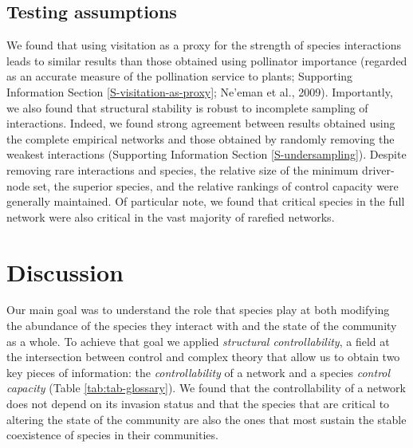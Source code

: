 \documentclass[a4paper]{artikel1}
\newcommand{\R}[1]{\label{#1}\linelabel{#1}}
\theoremstyle{definition}
\theoremstyle{definition}
\theoremstyle{definition}
\theoremstyle{remark}
\begin{document}
\subsection{Testing assumptions}\label{testing-assumptions-1}

\R{testing-assumptions-results-line} We found that using visitation as a
proxy for the strength of species interactions leads to similar results
than those obtained using pollinator importance (regarded as an accurate
measure of the pollination service to plants; Supporting Information
Section \ref{S-visitation-as-proxy}; Ne'eman et al., 2009). Importantly,
we also found that structural stability is robust to incomplete sampling
of interactions. Indeed, we found strong agreement between results
obtained using the complete empirical networks and those obtained by
randomly removing the weakest interactions (Supporting Information
Section \ref{S-undersampling}). Despite removing rare interactions and
species, the relative size of the minimum driver-node set, the superior
species, and the relative rankings of control capacity were generally
maintained. Of particular note, we found that critical species in the
full network were also critical in the vast majority of rarefied
networks.

\section{Discussion}\label{discussion}

Our main goal was to understand the role that species play at both
modifying the abundance of the species they interact with and the state
of the community as a whole. To achieve that goal we applied
\emph{structural controllability}, a field at the intersection between
control and complex theory that allow us to obtain two key pieces of
information: the \emph{controllability} of a network and a species
\emph{control capacity} (Table \ref{tab:tab-glossary}). We found that
the controllability of a network does not depend on its invasion status
and that the species that are critical to altering the state of the
community are also the ones that most sustain the stable coexistence of
species in their communities.
\end{document}
